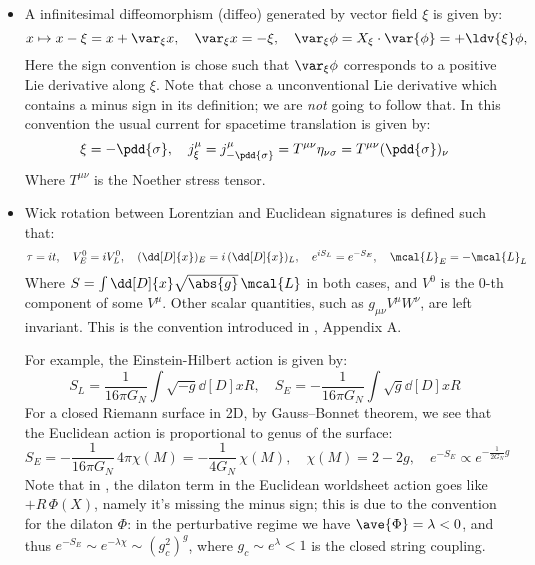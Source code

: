 \documentclass[a4paper
	,10pt
]{article}
\begin{document}
	\begin{itemize}
	\item A infinitesimal diffeomorphism (diffeo) generated by vector field $\xi$ is given by:
	\begin{equation}
		x\mapsto x - \xi = x + \var_\xi {x},
	\quad
		\var_\xi {x}
		= -\xi,
	\quad
		\var_\xi \phi
		= X_\xi \cdot \var{\phi}
		= +\ldv{\xi} \phi,
	\end{equation}
	Here the sign convention is chose such that $\var_\xi \phi$ corresponds to a positive Lie derivative along $\xi$. Note that \cite{Banados:2016zim} chose a unconventional Lie derivative which contains a minus sign in its definition; we are \textit{not} going to follow that. In this convention the usual current for spacetime translation is given by:
	\begin{equation}
		\xi = -\pdd{\sigma},
	\quad
		j^\mu_\xi = j^\mu_{-\pdd{\sigma}}
		= T^{\mu\nu} \eta_{\nu\sigma}
		= T^{\mu\nu} (\pdd{\sigma})_\nu
	\label{eq:Noether_stress_convention}
	\end{equation}
	Where $T^{\mu\nu}$ is the Noether stress tensor. 
	
	\item Wick rotation between Lorentzian and Euclidean signatures is defined such that:
	\begin{equation}
		\tau = it,
	\quad
		V^0_E = iV^0_L,
	\quad
		(\dd[D]{x})_E
		= i\,(\dd[D]{x})_L,
	\quad
		e^{iS_L} = e^{-S_E},
	\quad
		\mcal{L}_E
		= -\mcal{L}_L
	\label{eq:Wick_rotation}
	\end{equation}
	Where $
		S = \int \dd[D]{x} \sqrt{\abs{g}}\,\mcal{L}
	$ in both cases, and $V^0$ is the 0-th component of some $V^\mu$. Other scalar quantities, such as $
		g_{\mu\nu} V^\mu W^\nu
	$, are left invariant. This is the convention introduced in \textcite{Polchinski:1998rq}, Appendix A. 
	
	For example, the Einstein-Hilbert action is given by:
	\begin{equation}
		S_L = \frac{1}{16\pi G_N}
			\int \sqrt{-g} \dd[D]{x} R,
	\quad
		S_E = -\frac{1}{16\pi G_N}
			\int \sqrt{g} \dd[D]{x} R
	\end{equation}
	For a closed Riemann surface in 2D, by Gauss--Bonnet theorem, we see that the Euclidean action is proportional to genus of the surface:
	\begin{equation}
		S_E = -\frac{1}{16\pi G_N}\,
			4\pi \chi(M)
		= -\frac{1}{4G_N}\,\chi(M),
	\quad
		\chi(M) = 2 - 2g,
	\quad
		e^{-S_E}
		\propto e^{-\frac{1}{2G_N} g}
	\end{equation}
	Note that in \textcite{Polchinski:1998rq}, the dilaton term in the Euclidean worldsheet action  goes like $+R\,\Phi(X)$, namely it's missing the minus sign; this is due to the convention for the dilaton $\Phi$: in the perturbative regime we have $\ave{\Phi} = \lambda < 0$, and thus $
		e^{-S_E} \sim e^{-\lambda \chi}
		\sim (g_c^2)^g
	$, where $
		g_c \sim e^\lambda < 1
	$ is the closed string coupling. 
	

\end{itemize}
\end{document}
